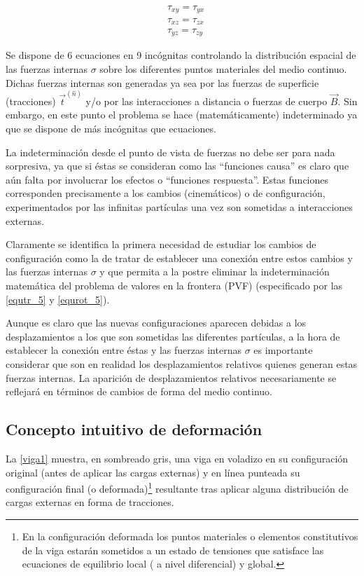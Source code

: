 \documentclass[../notas medios.tex]{subfiles}
\begin{document}
\begin{equation} \label{equrot_5}
\begin{split}
& \tau _{xy} = {\tau _{yx}} \\
& \tau _{xz} = {\tau _{zx}} \\
& \tau _{yz} = {\tau _{zy}}
\end{split}
\end{equation}

Se dispone de 6 ecuaciones en 9 incógnitas controlando la distribución espacial de las fuerzas internas $\sigma$ sobre los diferentes puntos materiales del medio continuo.  Dichas fuerzas internas son generadas ya sea por las fuerzas de superficie (tracciones) ${{\vec t}^{(\hat n)}}$  y/o por las interacciones a distancia o fuerzas de cuerpo ${\vec B}$.  Sin embargo, en este punto el problema se hace (matemáticamente) indeterminado ya que se dispone de más incógnitas que ecuaciones.

La indeterminación desde el punto de vista de fuerzas no debe ser para nada sorpresiva, ya que si éstas se consideran como las “funciones causa” es claro que aún falta por involucrar los efectos o “funciones respuesta”. Estas funciones corresponden precisamente a los cambios (cinemáticos) o de configuración, experimentados por las infinitas partículas una vez son sometidas a interacciones externas.

Claramente se identifica la primera necesidad de estudiar los cambios de configuración como la de tratar de establecer una conexión entre estos cambios y las fuerzas internas $\sigma$ y que permita a la postre eliminar la indeterminación matemática del problema de valores en la frontera (PVF) (especificado por las \cref{equtr_5} y \cref{equrot_5}).

Aunque es claro que las nuevas configuraciones aparecen debidas a los desplazamientos a los que son sometidas las diferentes partículas, a la hora de establecer la conexión entre éstas y las fuerzas internas $\sigma$ es importante considerar que son en realidad los desplazamientos relativos  quienes generan estas fuerzas internas.  La aparición de desplazamientos relativos necesariamente se reflejará en términos de cambios de forma  del medio continuo.

\subsection{Concepto intuitivo de deformación}
La \cref{viga1} muestra, en sombreado gris, una viga en voladizo en su configuración original (antes de aplicar las cargas externas) y en línea punteada su configuración final (o deformada)\footnote{En la configuración deformada los puntos materiales o elementos constitutivos de la viga estarán sometidos a un estado de tensiones que satisface las ecuaciones de equilibrio local ( a nivel diferencial) y global.} resultante tras aplicar alguna distribución de cargas externas en forma de tracciones.
\end{document}
